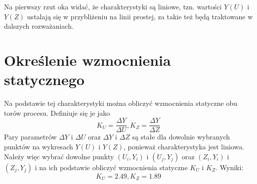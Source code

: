 Na pierwszy rzut oka widać, że charakterystyki są liniowe, tzn. wartości $Y(U)$ i $Y(Z)$ ustalają się w przybliżeniu na linii prostej, za takie też będą traktowane w dalszych rozważaniach.

\section{Określenie wzmocnienia statycznego}
Na podstawie tej charakterystyki można obliczyć wzmocnienia statyczne obu torów procesu. Definiuje się je jako
\begin{equation}
K_U=\frac{\Delta Y}{\Delta U}, K_Z=\frac{\Delta Y}{\Delta Z}
\end{equation}
Pary parametrów $\Delta Y$ i $\Delta U$ oraz $\Delta Y$ i $\Delta Z$ są stałe dla dowolnie wybranych punktów na wykresach $Y(U)$ i $Y(Z)$, ponieważ charakterystyka jest liniowa. Należy więc wybrać dowolne punkty $(U_i, Y_i)$ i $(U_j, Y_j)$ oraz $(Z_i, Y_i)$ i $(Z_j, Y_j)$ i na ich podstawie obliczyć wzmocnienia statyczne $K_U$ i $K_Z$. Wyniki:
\begin{equation}
K_U=\num{2.49}, K_Z=\num{1.89}
\end{equation}